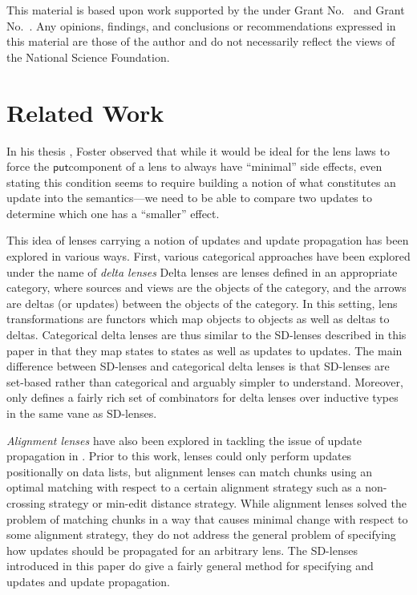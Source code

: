 \documentclass[acmsmall,review,anonymous]{acmart}\settopmatter{printfolios=true,printccs=false,printacmref=false}
\newcommand{\kw}[1]{\ensuremath{\mathsf{#1}}}
\newcommand{\pput}{\ensuremath{\kw{put}}}
\begin{document}
\begin{acks}                            %
This material is based upon work supported by the
 under Grant
No.~ and Grant
No.~.  Any opinions, findings, and
conclusions or recommendations expressed in this material are those
of the author and do not necessarily reflect the views of the
National Science Foundation.
\end{acks}

\section{Related Work}
In his thesis \cite{foster2009bidirectional}, Foster observed that while it would be
ideal for the lens laws to force the \pput component of a lens to always have
``minimal'' side effects, even stating this condition seems to require
building a notion of what constitutes an update into the semantics---we need to
be able to compare two updates to determine which one has a ``smaller'' effect.

This idea of lenses carrying a notion of updates and update propagation has been
explored in various ways. First, various categorical approaches have been
explored under the name of {\em delta lenses}
\cite{diskin2011state,johnson2017symmetric,pacheco2012delta,johnson2012lenses}
Delta lenses are lenses defined in an appropriate category, where sources and
views are the objects of the category, and the arrows are deltas (or updates)
between the objects of the category. In this setting, lens transformations are
functors which map objects to objects as well as deltas to deltas. Categorical
delta lenses are thus similar to the SD-lenses described in this paper in that
they map states to states as well as updates to updates. The main difference
between SD-lenses and categorical delta lenses is that SD-lenses are
set-based rather than categorical and arguably simpler to understand. Moreover,
only \cite{pacheco2012delta} defines a fairly rich set of combinators for delta
lenses over inductive types in the same vane as SD-lenses.

{\em Alignment lenses} have also been explored in tackling the issue of update
propagation in \cite{bohannon2008boomerang,barbosa2010matching}. Prior to this
work, lenses could only perform updates positionally on data lists, but
alignment lenses can match chunks using an optimal matching with
respect to a certain alignment strategy such as a non-crossing strategy or
min-edit distance strategy. While alignment lenses solved the problem of
matching chunks in a way that causes minimal change with respect to some
alignment strategy, they do not address the general problem of specifying how
updates should be propagated for an arbitrary lens. The SD-lenses introduced in
this paper do give a fairly general method for specifying and updates and update
propagation.
\end{document}
